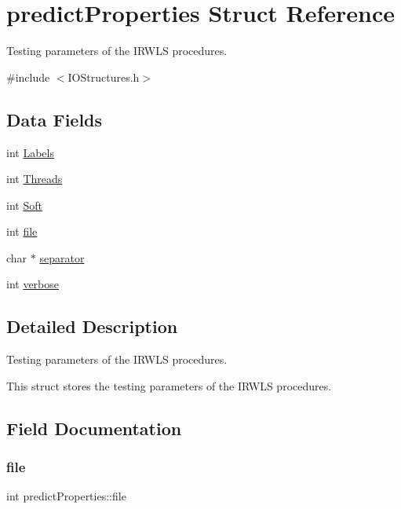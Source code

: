\hypertarget{structpredictProperties}{}\section{predict\+Properties Struct Reference}
\label{structpredictProperties}


Testing parameters of the I\+R\+W\+LS procedures.  




{\ttfamily \#include $<$I\+O\+Structures.\+h$>$}

\subsection*{Data Fields}
\begin{DoxyCompactItemize}
\item 
int \hyperlink{structpredictProperties_a580276e3e15305d5ac16d9ce0eb9b20a}{Labels}
\item 
int \hyperlink{structpredictProperties_a602116e0d46424243cb4c971c03695e1}{Threads}
\item 
int \hyperlink{structpredictProperties_a3af58f4dd3147f2896e024e89307f7ac}{Soft}
\item 
int \hyperlink{structpredictProperties_ae5f93424df7baeb996fd323233a05cac}{file}
\item 
char $\ast$ \hyperlink{structpredictProperties_a46ba29899b9f858272e17856bbc35876}{separator}
\item 
int \hyperlink{structpredictProperties_acd0a668ce39a7201277c247ac177a48f}{verbose}
\end{DoxyCompactItemize}


\subsection{Detailed Description}
Testing parameters of the I\+R\+W\+LS procedures. 

This struct stores the testing parameters of the I\+R\+W\+LS procedures. 

\subsection{Field Documentation}
\hypertarget{structpredictProperties_ae5f93424df7baeb996fd323233a05cac}{}\label{structpredictProperties_ae5f93424df7baeb996fd323233a05cac} 
\subsubsection{\texorpdfstring{file}{file}}
{\ttfamily int predict\+Properties\+::file}

